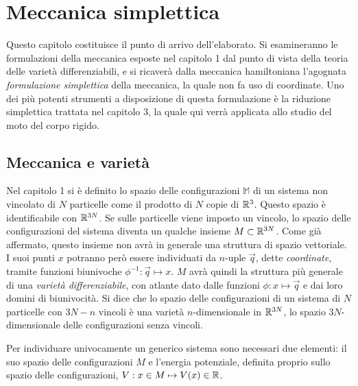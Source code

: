 \chapter{Meccanica simplettica}
Questo capitolo costituisce il punto di arrivo dell'elaborato. Si esamineranno le formulazioni della meccanica esposte nel capitolo 1 dal punto di vista della teoria delle varietà differenziabili, e si ricaverà dalla meccanica hamiltoniana l'agognata \emph{formulazione simplettica} della meccanica, la quale non fa uso di coordinate. Uno dei più potenti strumenti a disposizione di questa formulazione è la riduzione simplettica trattata nel capitolo 3, la quale qui verrà applicata allo studio del moto del corpo rigido.

\section{Meccanica e varietà}
Nel capitolo 1 si è definito lo spazio delle configurazioni $\mathbb{M}$ di un sistema non vincolato di $N$ particelle come il prodotto di $N$ copie di $\mathbb{R}^{3}$. Questo spazio è identificabile con $\mathbb{R}^{3N}$. Se sulle particelle viene imposto un vincolo, lo spazio delle configurazioni del sistema diventa un qualche insieme $M \subset \mathbb{R}^{3N}$. Come già affermato, questo insieme non avrà in generale una struttura di spazio vettoriale. I suoi punti $x$ potranno però essere individuati da $n$-uple $\vec{q}$, dette \emph{coordinate}, tramite funzioni biunivoche $\phi^{-1}: \vec{q} \mapsto x$. $M$ avrà quindi la struttura più generale di una \emph{varietà differenziabile}, con atlante dato dalle funzioni $\phi: x \mapsto \vec{q}$ e dai loro domini di biunivocità. Si dice che lo spazio delle configurazioni di un sistema di $N$ particelle con $3N-n$ vincoli è una varietà $n$-dimensionale  in $\mathbb{R}^{3N}$, lo spazio $3N$-dimensionale delle configurazioni senza vincoli.

Per individuare univocamente un generico sistema sono necessari due elementi: il suo spazio delle configurazioni $M$ e l'energia potenziale, definita proprio sullo spazio delle configurazioni, $V: x \in M \mapsto V(x) \in \mathbb{R}$.  


